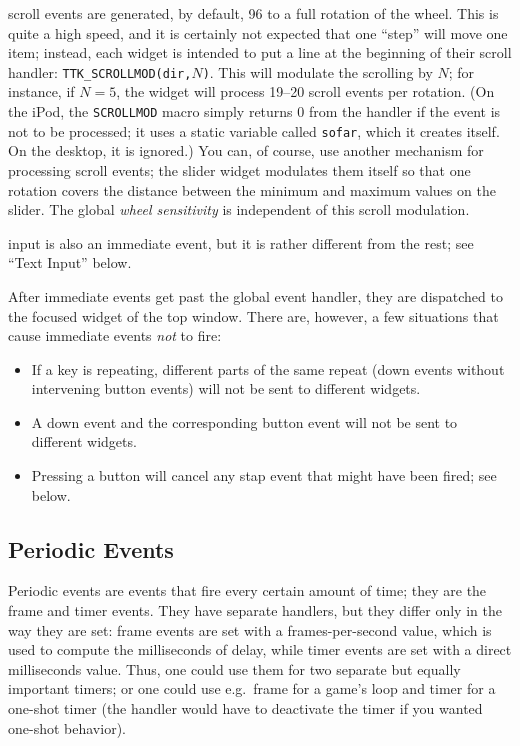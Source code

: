 \documentclass[12pt,letterpaper]{report}
\begin{document}
{\sf scroll} events are generated, by default, 96 to a full rotation of the wheel. This is quite
a high speed, and it is certainly not expected that one ``step'' will move one item; instead,
each widget is intended to put a line at the beginning of their scroll handler:
\verb|TTK_SCROLLMOD(dir,|$N$\verb|)|. This will modulate the scrolling by $N$; for instance, if 
$N = 5$, the widget will process 19--20 scroll events per rotation. (On the iPod, the \verb|SCROLLMOD|
macro simply returns 0 from the handler if the event is not to be processed; it uses a static variable
called \verb|sofar|, which it creates itself. On the desktop, it is ignored.) You can, of course,
use another mechanism for processing scroll events; the slider widget modulates them itself so
that one rotation covers the distance between the minimum and maximum values on the slider.
The global {\sl wheel sensitivity} is independent of this scroll modulation.

{\sf input} is also an immediate event, but it is rather different from the rest; see ``Text Input'' below.

After immediate events get past the global event handler, they are dispatched to the focused widget
of the top window. There are, however, a few situations that cause immediate events \emph{not} to fire:
\begin{itemize}
\item If a key is repeating, different parts of the same repeat ({\sf down} events without intervening {\sf button} events)
will not be sent to different widgets.
\item A {\sf down} event and the corresponding {\sf button} event will not be sent to different widgets.
\item Pressing a button will cancel any {\sf stap} event that might have been fired; see below.
\end{itemize}

\subsection{Periodic Events}
Periodic events are events that fire every certain amount of time; they are the {\sf frame} and
{\sf timer} events. They have separate handlers, but they
differ only in the way they are set: {\sf frame} events are set with a frames-per-second value,
which is used to compute the milliseconds of delay, while {\sf timer} events are set with a direct
milliseconds value. Thus, one could use them for two separate but equally important timers; or one
could use e.g.~{\sf frame} for a game's loop and {\sf timer} for a one-shot timer (the handler
would have to deactivate the timer if you wanted one-shot behavior).
\end{document}
